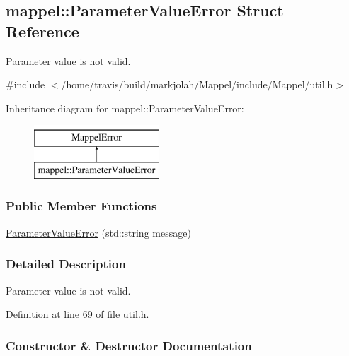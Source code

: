 \hypertarget{structmappel_1_1ParameterValueError}{}\subsection{mappel\+:\+:Parameter\+Value\+Error Struct Reference}
\label{structmappel_1_1ParameterValueError}


Parameter value is not valid.  




{\ttfamily \#include $<$/home/travis/build/markjolah/\+Mappel/include/\+Mappel/util.\+h$>$}

Inheritance diagram for mappel\+:\+:Parameter\+Value\+Error\+:\begin{figure}[H]
\begin{center}
\leavevmode
\includegraphics[height=2.000000cm]{structmappel_1_1ParameterValueError}
\end{center}
\end{figure}
\subsubsection*{Public Member Functions}
\begin{DoxyCompactItemize}
\item 
\hyperlink{structmappel_1_1ParameterValueError_af29c96326ba3a86a52f447c135d762cf}{Parameter\+Value\+Error} (std\+::string message)
\end{DoxyCompactItemize}


\subsubsection{Detailed Description}
Parameter value is not valid. 

Definition at line 69 of file util.\+h.



\subsubsection{Constructor \& Destructor Documentation}
